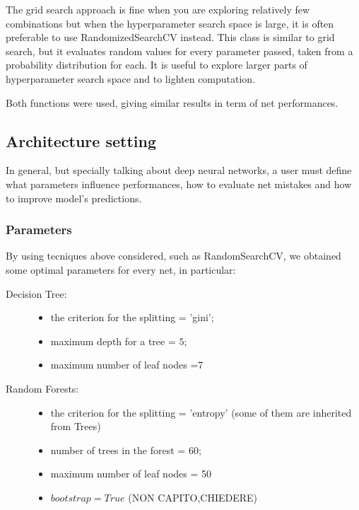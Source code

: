 \documentclass{article}
\begin{document}
The grid search approach is fine when you are exploring relatively few combinations but when the hyperparameter search space is large, it is often preferable to use RandomizedSearchCV instead. This class is similar to grid search, but it evaluates random values for every parameter passed, taken from a probability distribution for each.
It is useful to explore larger parts of hyperparameter search space and to lighten computation.

Both functions were used, giving similar results in term of net performances.


\subsection{Architecture setting}
In general, but specially talking about deep neural networks, a user must define what parameters influence performances, how to evaluate net mistakes and how to improve model's predictions.


\subsubsection{Parameters}

By using tecniques above considered, such as RandomSearchCV, we obtained some optimal parameters for every net, in particular:

\begin{description}[align=left]
\item [SVM:]
\end{description}

\begin{description}
\item [Decision Tree:] \begin{itemize}

\item the criterion for the splitting = 'gini';
\item maximum depth for a tree = $5$;
\item maximum number of leaf nodes =7
\end{itemize}
\end{description}

\begin{description}
\item[Random Forests:]\begin{itemize}

\item the criterion for the splitting = 'entropy' (some of them are inherited from Trees)
\item number of trees in the forest = 60;
\item maximum number of leaf nodes = 50
\item $bootstrap=True$ (NON CAPITO,CHIEDERE)
\end{itemize}
\end{description}
                            
\end{document}
